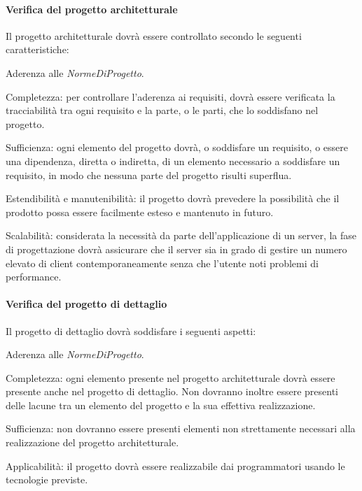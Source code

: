 \paragraph{Verifica del progetto architetturale}
Il progetto architetturale dovr\`a essere controllato secondo le seguenti caratteristiche:
\begin{elenconumerato}[\textbf{}]{\subsubsecindent}
\item Aderenza alle \textit{NormeDiProgetto}.
\item Completezza: per controllare l'aderenza ai requisiti, dovr\`a essere verificata la tracciabilit\`a tra ogni requisito e la parte, o le parti, che lo soddisfano nel progetto.
\item Sufficienza: ogni elemento del progetto dovr\`a, o soddisfare un requisito, o essere una dipendenza, diretta o indiretta, di un elemento necessario a soddisfare un requisito, in modo che nessuna parte del progetto risulti superflua.
\item Estendibilit\`a e manutenibilit\`a: il progetto dovr\`a prevedere la possibilit\`a che il prodotto possa essere facilmente esteso e mantenuto in futuro.
\item Scalabilit\`a: considerata la necessit\`a da parte dell'applicazione di un server, la fase di progettazione dovr\`a assicurare che il server sia in grado di gestire un numero elevato di client contemporaneamente senza che l'utente noti problemi di performance.
\end{elenconumerato}
\paragraph{Verifica del progetto di dettaglio}
Il progetto di dettaglio dovr\`a soddisfare i seguenti aspetti:
\begin{elenconumerato}[\textbf{}]{\subsubsecindent}
\item Aderenza alle \textit{NormeDiProgetto}.
\item Completezza: ogni elemento presente nel progetto architetturale dovr\`a essere presente anche nel progetto di dettaglio. Non dovranno inoltre essere presenti delle lacune tra un elemento del progetto e la sua effettiva realizzazione.
\item Sufficienza: non dovranno essere presenti elementi non strettamente necessari alla realizzazione del progetto architetturale.
\item Applicabilit\`a: il progetto dovr\`a essere realizzabile dai programmatori usando le tecnologie previste.
\end{elenconumerato}

